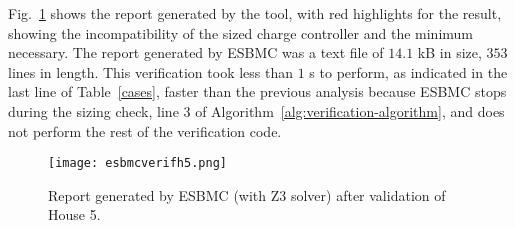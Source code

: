Fig.~\ref{fig:esbmcverifhouse5} shows the report generated by the tool, with red highlights for the result, showing the incompatibility of the sized charge controller and the minimum necessary. The report generated by ESBMC was a text file of $14.1$ kB in size, $353$ lines in length. This verification took less than $1$ s to perform, as indicated in the last line of Table~\ref{cases}, faster than the previous analysis because ESBMC stops during the sizing check, line $3$ of Algorithm~\ref{alg:verification-algorithm}, and does not perform the rest of the verification code.

\begin{figure}[h]
\texttt{[image: esbmcverifh5.png]}
\centering
\caption{Report generated by ESBMC (with Z3 solver) after validation of House 5.}
\label{fig:esbmcverifhouse5}
\end{figure}

%
%
%

